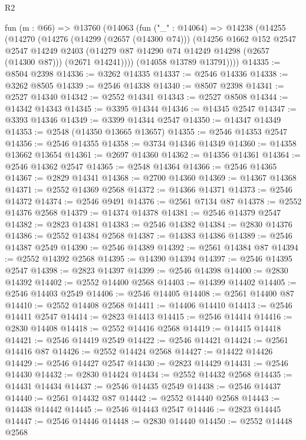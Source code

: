 \begin{lexlean}{R2}
\begin{coremodule}
  fun (m : @66) =>
  @13760
    (@14063
      (fun ("_" : @14064) =>
      @14238
        (@14255
          (@14270
            (@14276
              (@14299 (@2657 (@14300 @74)))
              (@14256
                @1662
                @152
                @2547
                @2547
                @14249
                @2403
                (@14279 @87 @14290 @74 @14249 @14298 (@2657 (@14300 @87)))
                (@2671 @14241))))
          (@14058 @13789 @13791))))
@14335 := @8504 @2398
@14336 := @3262 @14335
@14337 := @2546 @14336
@14338 := @3262 @8505
@14339 := @2546 @14338
@14340 := @8507 @2398
@14341 := @2527 @14340
@14342 := @2552 @14341
@14343 := @2527 @8508
@14344 := @14342 @14343
@14345 := @3395 @14344
@14346 := @14345 @2547
@14347 := @3393 @14346
@14349 := @3399 @14344 @2547
@14350 := @14347 @14349
@14353 := @2548 (@14350 @13665 @13657)
@14355 := @2546 @14353 @2547
@14356 := @2546 @14355
@14358 := @3734 @14346 @14349
@14360 := @14358 @13662 @13654
@14361 := @2697 @14360
@14362 := @14356 @14361
@14364 := @2546 @14362 @2547
@14365 := @2548 @14364
@14366 := @2546 @14365
@14367 := @2829 @14341
@14368 := @2700 @14360
@14369 := @14367 @14368
@14371 := @2552 @14369 @2568
@14372 := @14366 @14371
@14373 := @2546 @14372
@14374 := @2546 @9491
@14376 := @2561 @7134 @87
@14378 := @2552 @14376 @2568
@14379 := @14374 @14378
@14381 := @2546 @14379 @2547
@14382 := @2823 @14381
@14383 := @2546 @14382
@14384 := @2830 @14376
@14386 := @2552 @14384 @2568
@14387 := @14383 @14386
@14389 := @2546 @14387 @2549
@14390 := @2546 @14389
@14392 := @2561 @14384 @87
@14394 := @2552 @14392 @2568
@14395 := @14390 @14394
@14397 := @2546 @14395 @2547
@14398 := @2823 @14397
@14399 := @2546 @14398
@14400 := @2830 @14392
@14402 := @2552 @14400 @2568
@14403 := @14399 @14402
@14405 := @2546 @14403 @2549
@14406 := @2546 @14405
@14408 := @2561 @14400 @87
@14410 := @2552 @14408 @2568
@14411 := @14406 @14410
@14413 := @2546 @14411 @2547
@14414 := @2823 @14413
@14415 := @2546 @14414
@14416 := @2830 @14408
@14418 := @2552 @14416 @2568
@14419 := @14415 @14418
@14421 := @2546 @14419 @2549
@14422 := @2546 @14421
@14424 := @2561 @14416 @87
@14426 := @2552 @14424 @2568
@14427 := @14422 @14426
@14429 := @2546 @14427 @2547
@14430 := @2823 @14429
@14431 := @2546 @14430
@14432 := @2830 @14424
@14434 := @2552 @14432 @2568
@14435 := @14431 @14434
@14437 := @2546 @14435 @2549
@14438 := @2546 @14437
@14440 := @2561 @14432 @87
@14442 := @2552 @14440 @2568
@14443 := @14438 @14442
@14445 := @2546 @14443 @2547
@14446 := @2823 @14445
@14447 := @2546 @14446
@14448 := @2830 @14440
@14450 := @2552 @14448 @2568

\end{coremodule}
\end{lexlean}
